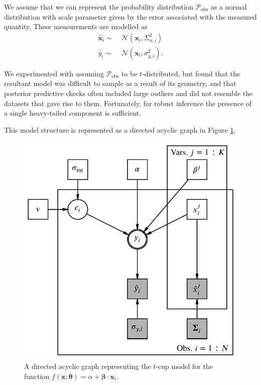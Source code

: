 \documentclass[fleqn,usenatbib]{rasti}
\newcommand{\indepvars}{\boldsymbol{x}_i}
\newcommand{\obsdep}{\hat{y}_i}
\newcommand{\obsindep}{\hat{\boldsymbol{x}}_i}
\newcommand{\indepcov}{\Sigma_{x, i}}
\newcommand{\deperr}{\sigma_{y, i}}
\begin{document}
We assume that we can represent the probability distribution
$\mathcal P_{\text{obs}}$ as a normal distribution with scale parameter given by
the error associated with the measured quantity. These measurements are modelled
as
\begin{align}
    \obsindep \sim&\; \mathcal N\left({\indepvars}, \indepcov^2\right) \\
    \obsdep \sim&\; \mathcal N\left({\indepvars}, \deperr^2\right).
\end{align}

We experimented with assuming $\mathcal P_{\text{obs}}$ to be $t$-distributed,
but found that the resultant model was difficult to sample as a result of its
geometry, and that posterior predictive checks often included large outliers and
did not resemble the datasets that gave rise to them.  Fortunately, for robust
inference the presence of a single heavy-tailed component is sufficient.

This model structure is represented as a directed acyclic graph in Figure
\ref{fig:formalism.dag}.

\begin{figure}
	\includegraphics[width=\columnwidth]{graphics/dag.pdf}
    \caption{A directed acyclic graph representing the $t$-cup model for the
    function $f(\boldsymbol{x}; \boldsymbol{\theta}) = \alpha +
    \boldsymbol{\beta} \cdot \boldsymbol{x}_i$.}
    \label{fig:formalism.dag}
\end{figure}
\end{document}
